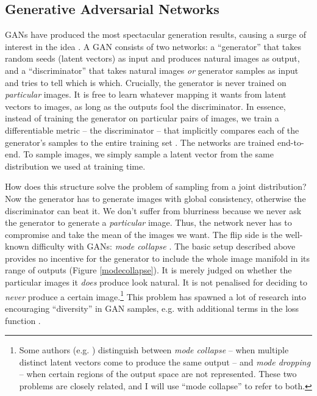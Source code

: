 \documentclass[11pt, a4paper]{book}
\newcommand{\nquote}[1]{``{#1}''}
\begin{document}
\subsection{Generative Adversarial Networks}

GANs \citep{gan} have produced the most spectacular generation results, causing a surge of interest in the idea \citep{imagefromcaption,unsupervisedgan,structurestylegan,texttoimagegan,imagetoimagegan,progressivegrowing}. A GAN consists of two networks: a \nquote{generator} that takes random seeds (latent vectors) as input and produces natural images as output, and a \nquote{discriminator} that takes natural images \emph{or} generator samples as input and tries to tell which is which. Crucially, the generator is never trained on \emph{particular} images. It is free to learn whatever mapping it wants from latent vectors to images, as long as the outputs fool the discriminator. In essence, instead of training the generator on particular pairs of images, we train a differentiable metric -- the discriminator -- that implicitly compares each of the generator's samples to the entire training set \citep{wgan}. The networks are trained end-to-end. To sample images, we simply sample a latent vector from the same distribution we used at training time.

How does this structure solve the problem of sampling from a joint distribution? Now the generator has to generate images with global consistency, otherwise the discriminator can beat it. We don't suffer from blurriness because we never ask the generator to generate a \emph{particular} image. Thus, the network never has to compromise and take the mean of the images we want. The flip side is the well-known difficulty with GANs: \emph{mode collapse} \citep{gantechniques}. The basic setup described above provides no incentive for the generator to include the whole image manifold in its range of outputs (Figure \ref{modecollapse}). It is merely judged on whether the particular images it \emph{does} produce look natural. It is not penalised for deciding to \emph{never} produce a certain image.\footnote{Some authors (e.g. \citet{ganmetrics}) distinguish between \emph{mode collapse} -- when multiple distinct latent vectors come to produce the same output -- and \emph{mode dropping} -- when certain regions of the output space are not represented. These two problems are closely related, and I will use \nquote{mode collapse} to refer to both.} This problem has spawned a lot of research into encouraging \nquote{diversity} in GAN samples, e.g. with additional terms in the loss function \citep{gantechniques,energygan,unrolledgan,wgan}.
\end{document}
